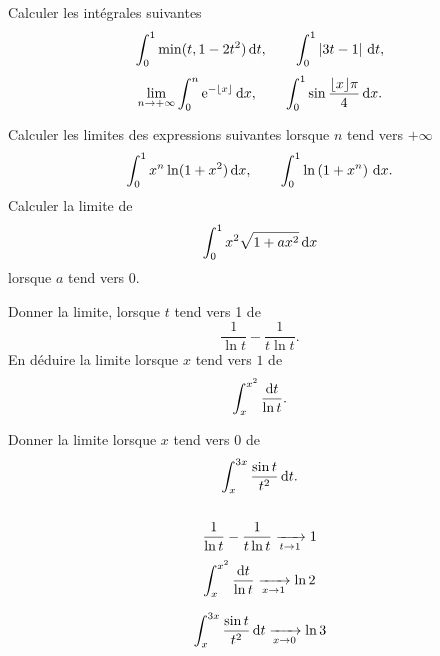 \documentclass{magnolia}
\begin{document}



Calculer les intégrales suivantes
\[\int_{0}^{1} \min(t, 1-2t^2)\,\text{d}t, \qquad
  \int_{0}^{1} \left|3t-1\right|\,\text{d}t,\]
\[\lim_{n\to+\infty} \integ{0}{n}{\e^{-\ent{x}}}{x}, \qquad
  \integ{0}{1}{\sin\frac{\ent{x}\pi}{4}}{x}.\]


\begin{questions}
\question Calculer les limites des expressions suivantes lorsque $n$ tend vers
  $+\infty$
  \[\int_{0}^{1} x^n\ln(1+x^2)\,\text{d}x, \qquad \int_{0}^{1} \ln\left(1+x^n\right)\,\text{d}x.\]
\question Calculer la limite de
  \[\int_{0}^{1} x^2\sqrt{1+ax^2}\,\text{d}x\]
  lorsque $a$ tend vers $0$.
\end{questions}

\begin{questions}
\question
  \begin{questions}
  \question Donner la limite, lorsque $t$ tend vers 1 de
    \[\frac{1}{\ln t}-\frac{1}{t\ln t}.\]
  \question En déduire la limite lorsque $x$ tend vers $1$ de
    \[\int_{x}^{x^2} \frac{\text{d}t}{\ln t}.\]
  \end{questions}
\question Donner la limite lorsque $x$ tend vers $0$ de
  \[\int_{x}^{3x} \frac{\sin t}{t^2}\,\text{d}t.\]
\end{questions}
\begin{sol}
$\quad$
\begin{questions}
\question
  \begin{questions}
  \question 
    \[\frac{1}{\ln t}-\frac{1}{t\ln t}\xrightarrow[t\rightarrow 1]{}1\]
  \question 
    \[\int_{x}^{x^2} \frac{\text{d}t}{\ln t}\xrightarrow[x\rightarrow 1]{}\ln 2\]    
  \end{questions}
\question 
  \[\int_{x}^{3x} \frac{\sin t}{t^2}\,\text{d}t\xrightarrow[x\rightarrow 0]{}\ln 3\]
\end{questions}
\end{sol}
\end{document}
